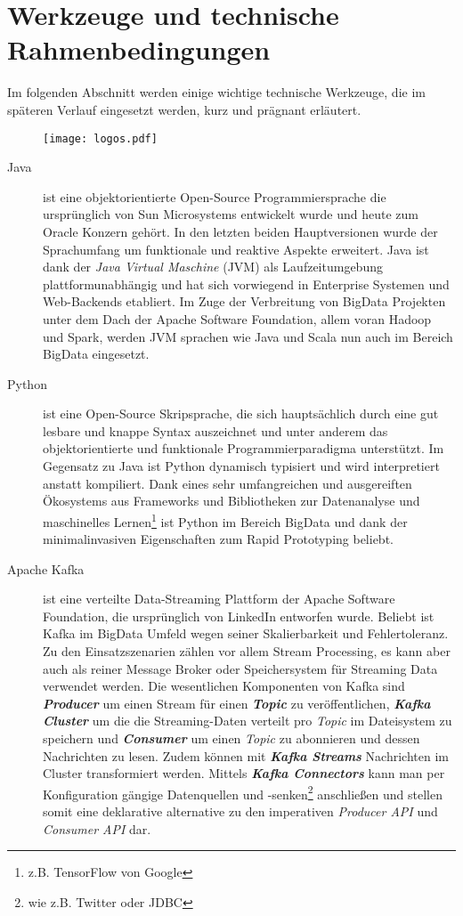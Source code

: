 \chapter{Werkzeuge und technische Rahmenbedingungen}
\label{chap:tools}
Im folgenden Abschnitt werden einige wichtige technische Werkzeuge, die im späteren Verlauf eingesetzt werden, kurz und prägnant erläutert.
\begin{figure}[h]
	\centering
	\texttt{[image: logos.pdf]}
	\label{fig:logos}
\end{figure}

\begin{description}
	\item [Java] ist eine objektorientierte Open-Source Programmiersprache die ursprünglich von Sun Microsystems entwickelt wurde und heute zum Oracle Konzern gehört. In den letzten beiden Hauptversionen wurde der Sprachumfang  um funktionale und reaktive Aspekte erweitert. Java ist dank der \textit{Java Virtual Maschine} (JVM) als Laufzeitumgebung plattformunabhängig und hat sich vorwiegend in Enterprise Systemen und Web-Backends etabliert.\autocite{java} Im Zuge der Verbreitung von BigData Projekten unter dem Dach der Apache Software Foundation, allem voran Hadoop und Spark, werden JVM sprachen wie Java und Scala nun auch im Bereich BigData eingesetzt.\autocite{apacheProjects}
	\item [Python] ist eine Open-Source Skripsprache, die sich hauptsächlich durch eine gut lesbare und knappe Syntax auszeichnet und unter anderem das objektorientierte und funktionale Programmierparadigma unterstützt. Im Gegensatz zu Java ist Python dynamisch typisiert und wird interpretiert anstatt kompiliert.\autocite{wikiPython} Dank eines sehr umfangreichen und ausgereiften Ökosystems aus Frameworks und Bibliotheken\autocite{awesome-python} zur Datenanalyse und maschinelles Lernen\footnote{z.B. TensorFlow von Google} ist Python im Bereich BigData  und dank der minimalinvasiven Eigenschaften zum Rapid Prototyping beliebt\autocite{quoraPython}.
	\item [Apache Kafka] ist eine verteilte Data-Streaming Plattform der Apache Software Foundation, die ursprünglich von LinkedIn entworfen wurde. Beliebt ist Kafka im BigData Umfeld wegen seiner Skalierbarkeit und Fehlertoleranz.  Zu den Einsatzszenarien zählen vor allem Stream Processing, es kann aber auch als reiner Message Broker oder Speichersystem für Streaming Data verwendet werden. Die wesentlichen Komponenten von Kafka sind \textbf{\textit{Producer}} um einen Stream für einen \textbf{\textit{Topic}} zu veröffentlichen, \textbf{\textit{Kafka Cluster}} um die die Streaming-Daten verteilt pro \textit{Topic} im Dateisystem zu speichern und \textbf{\textit{Consumer}} um einen \textit{Topic} zu abonnieren und dessen Nachrichten zu lesen. Zudem können mit \textbf{\textit{Kafka Streams}} Nachrichten im Cluster transformiert werden. Mittels \textbf{\textit{Kafka Connectors}} kann man per Konfiguration gängige Datenquellen und -senken\footnote{wie z.B. Twitter oder JDBC} anschließen und stellen somit eine deklarative alternative zu den imperativen \textit{Producer API} und \textit{Consumer API} dar.

\end{description}
